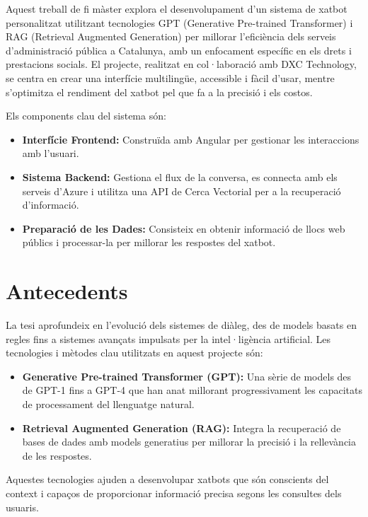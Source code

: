 \documentclass[a4paper,12pt,oneside]{ThesisStyle}
\begin{document}
Aquest treball de fi màster explora el desenvolupament d'un sistema de xatbot personalitzat utilitzant tecnologies GPT (Generative Pre-trained Transformer) i RAG (Retrieval Augmented Generation) per millorar l'eficiència dels serveis d'administració pública a Catalunya, amb un enfocament específic en els drets i prestacions socials. El projecte, realitzat en col·laboració amb DXC Technology, se centra en crear una interfície multilingüe, accessible i fàcil d'usar, mentre s'optimitza el rendiment del xatbot pel que fa a la precisió i els costos.

Els components clau del sistema són:

\begin{itemize}
    \item \textbf{Interfície Frontend:} Construïda amb Angular per gestionar les interaccions amb l'usuari.
    \item \textbf{Sistema Backend:} Gestiona el flux de la conversa, es connecta amb els serveis d'Azure i utilitza una API de Cerca Vectorial per a la recuperació d'informació.
    \item \textbf{Preparació de les Dades:} Consisteix en obtenir informació de llocs web públics i processar-la per millorar les respostes del xatbot.
\end{itemize}

\section{Antecedents}
\label{sec:background}

La tesi aprofundeix en l'evolució dels sistemes de diàleg, des de models basats en regles fins a sistemes avançats impulsats per la intel·ligència artificial. Les tecnologies i mètodes clau utilitzats en aquest projecte són:

\begin{itemize}
    \item \textbf{Generative Pre-trained Transformer (GPT):} Una sèrie de models des de GPT-1 fins a GPT-4 que han anat millorant progressivament les capacitats de processament del llenguatge natural.
    \item \textbf{Retrieval Augmented Generation (RAG):} Integra la recuperació de bases de dades amb models generatius per millorar la precisió i la rellevància de les respostes.
\end{itemize}

Aquestes tecnologies ajuden a desenvolupar xatbots que són conscients del context i capaços de proporcionar informació precisa segons les consultes dels usuaris.
\end{document}

